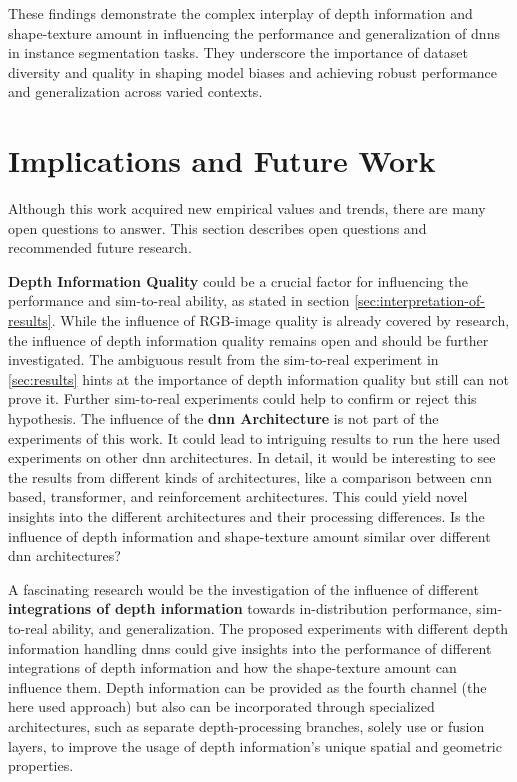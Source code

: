 		These findings demonstrate the complex interplay of depth information and shape-texture amount in influencing the performance and generalization of \ac{dnn}s in instance segmentation tasks. They underscore the importance of dataset diversity and quality in shaping model biases and achieving robust performance and generalization across varied contexts.
	
	
	\section{Implications and Future Work}
	\label{sec:implications-and-future-work}
		Although this work acquired new empirical values and trends, there are many open questions to answer. This section describes open questions and recommended future research.
		
		\textbf{Depth Information Quality} could be a crucial factor for influencing the performance and sim-to-real ability, as stated in section \ref{sec:interpretation-of-results}. While the influence of RGB-image quality is already covered by research, the influence of depth information quality remains open and should be further investigated. The ambiguous result from the sim-to-real experiment in \ref{sec:results} hints at the importance of depth information quality but still can not prove it. Further sim-to-real experiments could help to confirm or reject this hypothesis.
		\clearpage
		The influence of the \textbf{\ac{dnn} Architecture} is not part of the experiments of this work. It could lead to intriguing results to run the here used experiments on other \ac{dnn} architectures. In detail, it would be interesting to see the results from different kinds of architectures, like a comparison between \ac{cnn} based, transformer, and reinforcement architectures. This could yield novel insights into the different architectures and their processing differences. Is the influence of depth information and shape-texture amount similar over different \ac{dnn} architectures?
		
		A fascinating research would be the investigation of the influence of different \textbf{integrations of depth information} towards in-distribution performance, sim-to-real ability, and generalization. The proposed experiments with different depth information handling \ac{dnn}s could give insights into the performance of different integrations of depth information and how the shape-texture amount can influence them. Depth information can be provided as the fourth channel (the here used approach) but also can be incorporated through specialized architectures, such as separate depth-processing branches, solely use or fusion layers, to improve the usage of depth information's unique spatial and geometric properties.
		
